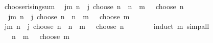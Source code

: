 \begin{isabellebody}
\ choose{\isacharunderscore}{\kern0pt}rising{\isacharunderscore}{\kern0pt}sum{\isacharcolon}{\kern0pt}\isanewline
\ \ {\isachardoublequoteopen}{\isacharparenleft}{\kern0pt}{\isasymSum}j{\isasymle}m{\isachardot}{\kern0pt}\ {\isacharparenleft}{\kern0pt}{\isacharparenleft}{\kern0pt}n\ {\isacharplus}{\kern0pt}\ j{\isacharparenright}{\kern0pt}\ choose\ n{\isacharparenright}{\kern0pt}{\isacharparenright}{\kern0pt}\ {\isacharequal}{\kern0pt}\ {\isacharparenleft}{\kern0pt}{\isacharparenleft}{\kern0pt}n\ {\isacharplus}{\kern0pt}\ m\ {\isacharplus}{\kern0pt}\ {}{\isacharparenright}{\kern0pt}\ choose\ {\isacharparenleft}{\kern0pt}n\ {\isacharplus}{\kern0pt}\ {}{\isacharparenright}{\kern0pt}{\isacharparenright}{\kern0pt}{\isachardoublequoteclose}\isanewline
\ \ {\isachardoublequoteopen}{\isacharparenleft}{\kern0pt}{\isasymSum}j{\isasymle}m{\isachardot}{\kern0pt}\ {\isacharparenleft}{\kern0pt}{\isacharparenleft}{\kern0pt}n\ {\isacharplus}{\kern0pt}\ j{\isacharparenright}{\kern0pt}\ choose\ n{\isacharparenright}{\kern0pt}{\isacharparenright}{\kern0pt}\ {\isacharequal}{\kern0pt}\ {\isacharparenleft}{\kern0pt}{\isacharparenleft}{\kern0pt}n\ {\isacharplus}{\kern0pt}\ m\ {\isacharplus}{\kern0pt}\ {}{\isacharparenright}{\kern0pt}\ choose\ m{\isacharparenright}{\kern0pt}{\isachardoublequoteclose}\isanewline
%
\isadelimproof
%
\endisadelimproof
%
\isatagproof
{}\isamarkupfalse%
\ {\isacharminus}{\kern0pt}\isanewline
\ \ \isamarkupfalse%
\ {\isachardoublequoteopen}{\isacharparenleft}{\kern0pt}{\isasymSum}j{\isasymle}m{\isachardot}{\kern0pt}\ {\isacharparenleft}{\kern0pt}{\isacharparenleft}{\kern0pt}n\ {\isacharplus}{\kern0pt}\ j{\isacharparenright}{\kern0pt}\ choose\ n{\isacharparenright}{\kern0pt}{\isacharparenright}{\kern0pt}\ {\isacharequal}{\kern0pt}\ {\isacharparenleft}{\kern0pt}{\isacharparenleft}{\kern0pt}n\ {\isacharplus}{\kern0pt}\ m\ {\isacharplus}{\kern0pt}\ {}{\isacharparenright}{\kern0pt}\ choose\ {\isacharparenleft}{\kern0pt}n\ {\isacharplus}{\kern0pt}\ {}{\isacharparenright}{\kern0pt}{\isacharparenright}{\kern0pt}{\isachardoublequoteclose}\isanewline
\ \ \ \ \isamarkupfalse%
\ {\isacharparenleft}{\kern0pt}induct\ m{\isacharparenright}{\kern0pt}\ simp{\isacharunderscore}{\kern0pt}all\isanewline
\ \ \isamarkupfalse%
\ \isamarkupfalse%
\ {\isachardoublequoteopen}{\isasymdots}\ {\isacharequal}{\kern0pt}\ {\isacharparenleft}{\kern0pt}n\ {\isacharplus}{\kern0pt}\ m\ {\isacharplus}{\kern0pt}\ {}{\isacharparenright}{\kern0pt}\ choose\ m{\isachardoublequoteclose}\isanewline

\end{isabellebody}
